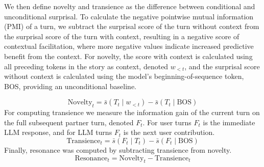 \documentclass[11pt]{article}
\begin{document}
We then define novelty and transience as the difference between conditional and unconditional surprisal. To calculate the negative pointwise mutual information (PMI) of a turn, we subtract the surprisal score of the turn without context from the surprisal score of the turn with context, resulting in a negative score of contextual facilitation, where more negative values indicate increased predictive benefit from the context. For novelty, the score with context is calculated using all preceding tokens in the story as context, denoted $w_{<t}$, and the surprisal score without context is calculated using the model's beginning-of-sequence token, BOS, providing an unconditional baseline.

\begin{equation}
\mathrm{Novelty}_t = \bar{s}(T_t \mid w_{<t}) - \bar{s}(T_t \mid \text{BOS})
\end{equation}
For computing transience we measure the information gain of the current turn on the full subsequent partner turn, denoted $F_t$. For user turns $F_t$ is the immediate LLM response, and for LLM turns $F_t$ is the next user contribution.
\begin{equation}
\mathrm{Transience}_t = \bar{s}(F_t \mid T_t) - \bar{s}(F_t \mid \text{BOS})
\end{equation}
Finally, resonance was computed by subtracting transience from novelty.
\begin{equation}
\mathrm{Resonance}_t = \mathrm{Novelty}_t - \mathrm{Transience}_t
\end{equation}
\end{document}
